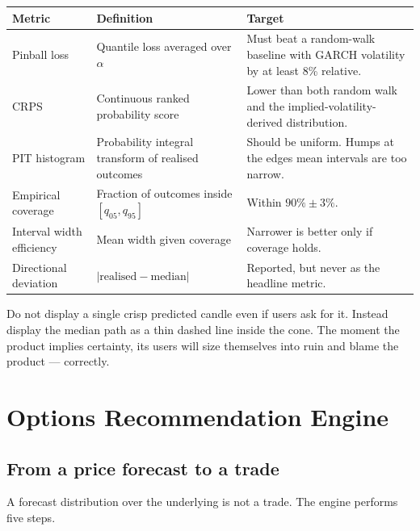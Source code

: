 \begin{longtable}{@{}p{4.0cm}p{4.6cm}p{5.8cm}@{}}
\toprule
\textbf{Metric} & \textbf{Definition} & \textbf{Target}\\
\midrule
Pinball loss & Quantile loss averaged over $\alpha$ & Must beat a random-walk
baseline with GARCH volatility by at least 8\% relative.\\
CRPS & Continuous ranked probability score & Lower than both random walk and the
implied-volatility-derived distribution.\\
PIT histogram & Probability integral transform of realised outcomes & Should be
uniform. Humps at the edges mean intervals are too narrow.\\
Empirical coverage & Fraction of outcomes inside $[q_{05},q_{95}]$ & Within
$90\% \pm 3\%$.\\
Interval width efficiency & Mean width given coverage & Narrower is better only
if coverage holds.\\
Directional deviation & $|\text{realised} - \text{median}|$ & Reported, but
never as the headline metric.\\
\bottomrule
\end{longtable}

\begin{warnbox}[title={Reject the temptation}]
Do not display a single crisp predicted candle even if users ask for it. Instead
display the median path as a thin dashed line inside the cone. The moment the
product implies certainty, its users will size themselves into ruin and blame
the product --- correctly.
\end{warnbox}

\chapter{Options Recommendation Engine}
\label{ch:options}

\section{From a price forecast to a trade}

A forecast distribution over the underlying is not a trade. The engine performs
five steps.

\begin{center}
\end{center}

